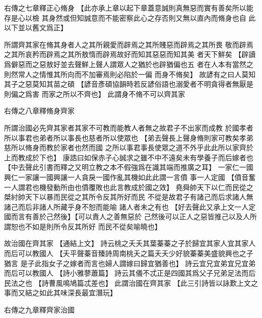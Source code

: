 \documentclass{zhvt-classic}
\begin{document}
\begin{preface}
右傳之七章釋正心脩身
  【此亦承上章以起下章蓋意誠則真無惡而實有善矣所以能存是心以檢
    其身然或但知誠意而不能密察此心之存否則又無以直內而脩身也自
    此以下並以舊文爲正】
\end{preface}

所謂齊其家在脩其身者人之其所親愛而辟焉之其所賤惡而辟焉之其所畏
敬而辟焉之其所哀矜而辟焉之其所敖惰而辟焉故好而知其惡惡而知其美
者天下鮮矣
  【辟讀爲僻惡而之惡敖好並去聲鮮上聲人謂眾人之猶於也辟猶偏也五
    者在人本有當然之則然常人之情惟其所向而不加審焉則必陷於一偏
    而身不脩矣】
故諺有之曰人莫知其子之惡莫知其苗之碩
  【諺音彥碩協韻時若反諺俗語也溺愛者不明貪得者無厭是則偏之爲害
    而家之所以不齊也】
此謂身不脩不可以齊其家

\begin{preface}
右傳之八章釋脩身齊家
\end{preface}

所謂治國必先齊其家者其家不可教而能教人者無之故君子不出家而成教
於國孝者所以事君也弟者所以事長也慈者所以使眾也
  【弟去聲長上聲身脩則家可教矣孝弟慈所以脩身而教於家者也然而國
    之所以事君事長使眾之道不外乎此此所以家齊於上而教成於下也】
康誥曰如保赤子心誠求之雖不中不遠矣未有學養子而后嫁者也
  【中去聲此引書而釋之又明立教之本不假強爲在識其端而推廣之耳】
一家仁一國興仁一家讓一國興讓一人貪戾一國作亂其機如此此謂一言僨
事一人定國
  【僨音奮一人謂君也機發動所由也僨覆敗也此言教成於國之效】
堯舜帥天下以仁而民從之桀紂帥天下以暴而民從之其所令反其所好而民
不從是故君子有諸己而后求諸人無諸己而后非諸人所藏乎身不恕而能喻
諸人者未之有也
  【好去聲此又承上文一人定國而言有善於己然後】\zhvph【可以責人之善無惡於
    己然後可以正人之惡皆推己以及人所謂恕也不如是則所令反其所好
    而民不從矣喻曉也】

故治國在齊其家
  【通結上文】
詩云桃之夭夭其葉蓁蓁之子於歸宜其家人宜其家人而后可以教國人
  【夭平聲蓁音臻詩周南桃夭之篇夭夭少好貌蓁蓁美盛貌興也之子猶言
    是子此指女子之嫁者而言也婦人謂嫁曰歸宜猶善也】
詩云宜兄宜弟宜兄宜弟而后可以教國人
  【詩小雅蓼蕭篇】
詩云其儀不忒正是四國其爲父子兄弟足法而后民法之也
  【詩曹風鳴鳩篇忒差也】
此謂治國在齊其家
  【此三引詩皆以詠歎上文之事而又結之如此其味深長最宜潛玩】

\begin{preface}
右傳之九章釋齊家治國
\end{preface}
\end{document}
